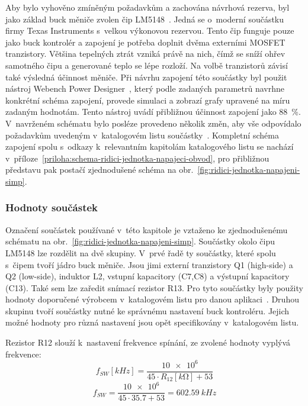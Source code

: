         
        Aby bylo vyhověno zmíněným požadavkům a zachována návrhová rezerva, byl jako základ buck měniče zvolen čip LM5148~\cite{lm5148-datasheet}. Jedná se o~moderní součástku firmy Texas Instruments s~velkou výkonovou rezervou. Tento čip funguje pouze jako buck kontrolér a zapojení je potřeba doplnit dvěma externími MOSFET tranzistory. Většina tepelných ztrát vzniká právě na nich, čímž se sníží ohřev samotného čipu a generované teplo se lépe rozloží. Na volbě tranzistorů závisí také výsledná účinnost měniče. Při návrhu zapojení této součástky byl použit nástroj Webench Power Designer~\cite{webench-power-designer}, který podle zadaných parametrů navrhne konkrétní schéma zapojení, provede simulaci a zobrazí grafy upravené na míru zadaným hodnotám. Tento nástroj uvádí přibližnou účinnost zapojení jako \qty{88}{\percent}. V~navrženém schématu bylo posléze provedeno několik změn, aby vše odpovídalo požadavkům uvedeným v~katalogovém listu součástky~\cite{lm5148-datasheet}. Kompletní schéma zapojení spolu s~odkazy k~relevantním kapitolám katalogového listu se nachází v~příloze~\ref{priloha:schema-ridici-jednotka-napajeci-obvod}, pro přibližnou představu pak postačí zjednodušené schéma na obr.~\ref{fig:ridici-jednotka-napajeni-simp}. 

        \subsubsection{Hodnoty součástek}
        Označení součástek používané v~této kapitole je vztaženo ke zjednodušenému schématu na obr.~\ref{fig:ridici-jednotka-napajeni-simp}. Součástky okolo čipu LM5148 lze rozdělit na dvě skupiny. V~prvé řadě ty součástky, které spolu s~čipem tvoří jádro buck měniče. Jsou jimi externí tranzistory Q1 (high-side) a Q2 (low-side), induktor L2, vstupní kapacitory (C7,C8) a výstupní kapacitory (C13). Také sem lze zaředit snímací rezistor R13. Pro tyto součástky byly použity hodnoty doporučené výrobcem v~katalogovém listu pro danou aplikaci~\cite{lm5148-datasheet}. Druhou skupinu tvoří součástky nutné ke správnému nastavení buck kontroléru. Jejich možné hodnoty pro různá nastavení jsou opět specifikovány v~katalogovém listu. 

        Rezistor R12 slouží k~nastavení frekvence spínání, ze zvolené hodnoty vyplývá frekvence:
        \begin{equation}
            f_{SW}[\unit{kHz}] = \frac{\num{10e6}}{45\cdot R_{12}[\unit{k\ohm}]+53 }
        \end{equation}
        \begin{equation}
            f_{SW} = \frac{\num{10e6}}{45\cdot \num{35.7}+53 } = \qty{602.59}{kHz}
        \end{equation}

